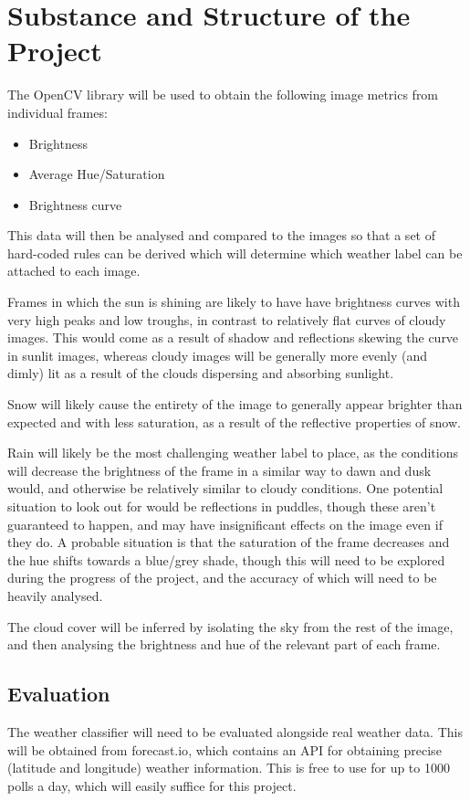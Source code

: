 \documentclass[12pt]{article}
\begin{document}
\section*{Substance and Structure of the Project}
The OpenCV library will be used to obtain the following image metrics from individual frames:
\begin{itemize}
	\item Brightness
	\item Average Hue/Saturation
	\item Brightness curve
\end{itemize}
This data will then be analysed and compared to the images so that a set of hard-coded rules can be derived which will determine which weather label can be attached to each image. 

Frames in which the sun is shining are likely to have have brightness curves with very high peaks and low troughs, in contrast to relatively flat curves of cloudy images. This would come as a result of shadow and reflections skewing the curve in sunlit images, whereas cloudy images will be generally more evenly (and dimly) lit as a result of the clouds dispersing and absorbing sunlight.

Snow will likely cause the entirety of the image to generally appear brighter than expected and with less saturation, as a result of the reflective properties of snow. 

Rain will likely be the most challenging weather label to place, as the conditions will decrease the brightness of the frame in a similar way to dawn and dusk would, and otherwise be relatively similar to cloudy conditions. One potential situation to look out for would be reflections in puddles, though these aren't guaranteed to happen, and may have insignificant effects on the image even if they do. A probable situation is that the saturation of the frame decreases and the hue shifts towards a blue/grey shade, though this will need to be explored during the progress of the project, and the accuracy of which will need to be heavily analysed.

The cloud cover will be inferred by isolating the sky from the rest of the image, and then analysing the brightness and hue of the relevant part of each frame. 

\subsection*{Evaluation}

The weather classifier will need to be evaluated alongside real weather data. This will be obtained from forecast.io\cite{forecast}, which contains an API\cite{forecastapi} for obtaining precise (latitude and longitude) weather information. This is free to use for up to 1000 polls a day, which will easily suffice for this project.
\end{document}
